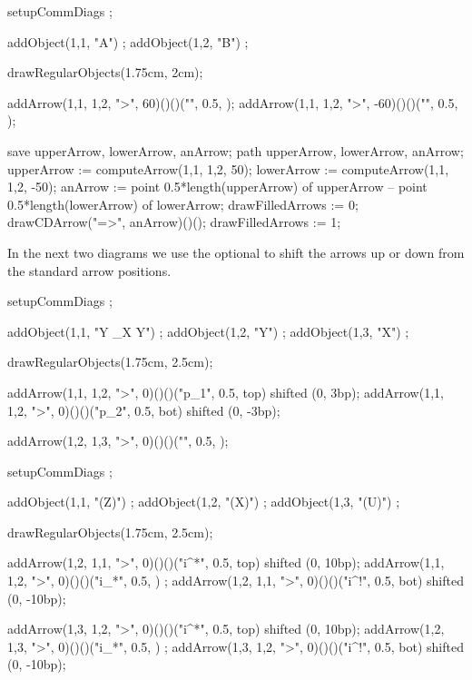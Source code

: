 \startbuffer[cdBuf]
\startformula{}
  setupCommDiags ;

  addObject(1,1, "A") ;
  addObject(1,2, "B") ;

  drawRegularObjects(1.75cm, 2cm);

  addArrow(1,1, 1,2, ">",  60)()()("", 0.5, );
  addArrow(1,1, 1,2, ">", -60)()()("", 0.5, );

  save upperArrow, lowerArrow, anArrow;
  path upperArrow, lowerArrow, anArrow;
  upperArrow := computeArrow(1,1, 1,2,  50);
  lowerArrow := computeArrow(1,1, 1,2, -50);
  anArrow    :=
    point 0.5*length(upperArrow) of upperArrow --
    point 0.5*length(lowerArrow) of lowerArrow;
  drawFilledArrows := 0;
  drawCDArrow("=>", anArrow)()();
  drawFilledArrows := 1;
\stopMPcode\stopformula
\stopbuffer

\processTEXbuffer[cdBuf]

\typebuffer[cdBuf]

In the next two diagrams we use the optional 
to shift the arrows up or down from the standard arrow positions.

\startbuffer[cdBuf]
\startformula{}
  setupCommDiags ;

  addObject(1,1, "Y \times_X Y") ;
  addObject(1,2, "Y") ;
  addObject(1,3, "X") ;

  drawRegularObjects(1.75cm, 2.5cm);

  addArrow(1,1, 1,2, ">", 0)()()("p_1", 0.5, top) shifted (0, 3bp);
  addArrow(1,1, 1,2, ">", 0)()()("p_2", 0.5, bot) shifted (0, -3bp);

  addArrow(1,2, 1,3, ">", 0)()()("", 0.5, );
\stopMPcode\stopformula
\stopbuffer

\processTEXbuffer[cdBuf]

\typebuffer[cdBuf]

\blank[2*big]

\startbuffer[cdBuf]
\startformula{}
  setupCommDiags ;

  addObject(1,1, "(Z)") ;
  addObject(1,2, "(X)") ;
  addObject(1,3, "(U)") ;

  drawRegularObjects(1.75cm, 2.5cm);

  addArrow(1,2, 1,1, ">", 0)()()("i^*", 0.5, top) shifted (0, 10bp);
  addArrow(1,1, 1,2, ">", 0)()()("i_*", 0.5,    ) ;
  addArrow(1,2, 1,1, ">", 0)()()("i^!", 0.5, bot) shifted (0, -10bp);

  addArrow(1,3, 1,2, ">", 0)()()("i^*", 0.5, top) shifted (0, 10bp);
  addArrow(1,2, 1,3, ">", 0)()()("i_*", 0.5,    ) ;
  addArrow(1,3, 1,2, ">", 0)()()("i^!", 0.5, bot) shifted (0, -10bp);
\stopMPcode\stopformula
\stopbuffer

